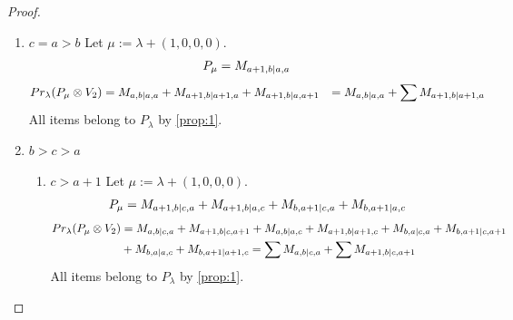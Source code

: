 \begin{proof}
\begin{enumerate}
\begin{enumerate}
\item $c=a+1$
        Let $\mu:=\lambda + (0,-1,0,1) $. 
\begin{equation}\notag
  \begin{aligned}
      P_{\mu} =M_{a,b-1|a+1,a+1}
  \end{aligned}
\end{equation}
\begin{equation}\notag
  \begin{aligned}
  Pr_{\lambda}(P_\mu \otimes V_5) &=
 M_{a+1,b|a+1,a+1}
+M_{a,b|a,a+1}
+M_{a,b|a+1,a}
                                  &=
\sum M_{a,b|a+1,a}
+ M_{a+1,b|a+1,a+1}
  \end{aligned}
\end{equation}
All items belong to $P_\lambda$ by \cref{prop:1}.
  \end{enumerate}
  
\item $c=a>b$
        Let $\mu:=\lambda + (1,0,0,0) $. 
\begin{equation}\notag
  \begin{aligned}
      P_{\mu} =M_{a+1,b|a,a}
  \end{aligned}
\end{equation}
\begin{equation}\notag
  \begin{aligned}
  Pr_{\lambda}(P_\mu \otimes V_2) &=
M_{a,b|a,a}
+M_{a+1,b|a+1,a}
+M_{a+1,b|a,a+1}
                                  &=
 M_{a,b|a,a}
+\sum M_{a+1,b|a+1,a}
  \end{aligned}
\end{equation}
All items belong to $P_\lambda$ by \cref{prop:1}.
  
\item $b>c>a$
  \begin{enumerate}
    \item $c>a+1$ 
        Let $\mu:=\lambda + (1,0,0,0) $. 
\begin{equation}\notag
  \begin{aligned}
      P_{\mu} =
      M_{a+1,b|c,a}
+M_{a+1,b|a,c}
+M_{b,a+1|c,a}
+M_{b,a+1|a,c}
  \end{aligned}
\end{equation}
\begin{equation}\notag
  \begin{aligned}
  Pr_{\lambda}(P_\mu \otimes V_2) &=
M_{a,b|c,a}
+M_{a+1,b|c,a+1}
+M_{a,b|a,c}
+M_{a+1,b|a+1,c} 
+M_{b,a|c,a}
+M_{b,a+1|c,a+1} \\
                                  &+
M_{b,a|a,c}
+M_{b,a+1|a+1,c}
=\sum M_{a,b|c,a}
+\sum M_{a+1,b|c,a+1}
  \end{aligned}
\end{equation}
All items belong to $P_\lambda$ by \cref{prop:1}.


\end{enumerate}
\end{enumerate}
\end{proof}
